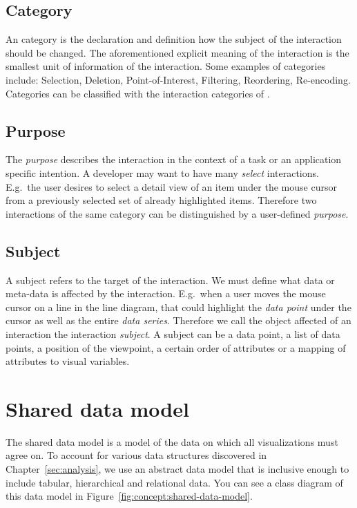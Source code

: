\subsection{Category}
An category is the declaration and definition how the subject of the interaction should be changed.
The aforementioned explicit meaning of the interaction is the smallest unit of information of the interaction.
Some examples of categories include: Selection, Deletion, Point-of-Interest, Filtering, Reordering, Re-encoding.
Categories can be classified with the interaction categories of \textcite{Yi2007}.

\subsection{Purpose}
The \emph{purpose} describes the interaction in the context of a task or an application specific intention.
A developer may want to have many \emph{select} interactions.
E.g.\ the user desires to select a detail view of an item under the mouse cursor from a previously selected set of already highlighted items.
Therefore two interactions of the same category can be distinguished by a user-defined \emph{purpose}.

\subsection{Subject}
A subject refers to the target of the interaction.
We must define what data or meta-data is affected by the interaction.
E.g.\ when a user moves the mouse cursor on a line in the line diagram, that could highlight the \emph{data point} under the cursor as well as the entire \emph{data series}.
Therefore we call the object affected of an interaction the interaction \emph{subject}.
A subject can be a data point, a list of data points, a position of the viewpoint, a certain order of attributes or a mapping of attributes to visual variables.



\section{Shared data model}\label{sec:concept:data-model}
The shared data model is a model of the data on which all visualizations must agree on.
To account for various data structures discovered in Chapter~\ref{sec:analysis}, we use an abstract data model that is inclusive enough to include tabular, hierarchical and relational data.
You can see a class diagram of this data model in Figure~\ref{fig:concept:shared-data-model}.

